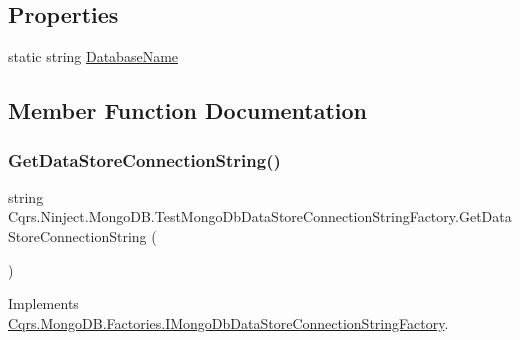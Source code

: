 \subsection*{Properties}
\begin{DoxyCompactItemize}
\item 
static string \hyperlink{classCqrs_1_1Ninject_1_1MongoDB_1_1TestMongoDbDataStoreConnectionStringFactory_a53412e87f2114b8a61d6898f7f290187_a53412e87f2114b8a61d6898f7f290187}{Database\+Name}
\end{DoxyCompactItemize}


\subsection{Member Function Documentation}
\mbox{\label{classCqrs_1_1Ninject_1_1MongoDB_1_1TestMongoDbDataStoreConnectionStringFactory_abc9f81219c65af4182635cd545282b65_abc9f81219c65af4182635cd545282b65}} 
\subsubsection{\texorpdfstring{Get\+Data\+Store\+Connection\+String()}{GetDataStoreConnectionString()}}
{\footnotesize\ttfamily string Cqrs.\+Ninject.\+Mongo\+D\+B.\+Test\+Mongo\+Db\+Data\+Store\+Connection\+String\+Factory.\+Get\+Data\+Store\+Connection\+String (\begin{DoxyParamCaption}{ }\end{DoxyParamCaption})}



Implements \hyperlink{interfaceCqrs_1_1MongoDB_1_1Factories_1_1IMongoDbDataStoreConnectionStringFactory_a31cb87fb2cf1435912f635394494ed91_a31cb87fb2cf1435912f635394494ed91}{Cqrs.\+Mongo\+D\+B.\+Factories.\+I\+Mongo\+Db\+Data\+Store\+Connection\+String\+Factory}.

